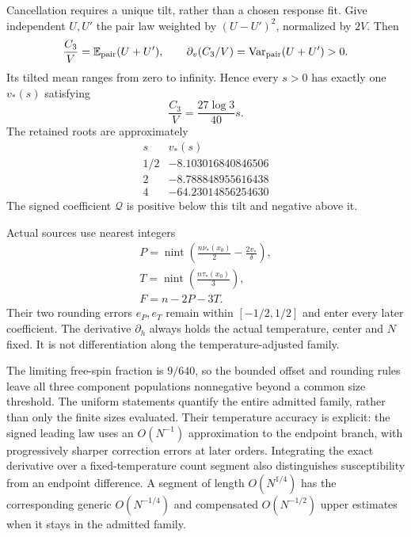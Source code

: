 Cancellation requires a unique tilt, rather than a chosen response fit. Give independent $U,U'$ the pair law weighted by $(U-U')^2$, normalized by $2V$. Then
\begin{equation}
 \frac{C_3}{V}=\mathbb E_{\rm pair}(U+U'),\qquad
 \partial_v(C_3/V)=\operatorname{Var}_{\rm pair}(U+U')>0.
\end{equation}
Its tilted mean ranges from zero to infinity. Hence every $s>0$ has exactly one $v_*(s)$ satisfying
\begin{equation}
 \frac{C_3}{V}=\frac{27\log3}{40}s.
\end{equation}
The retained roots are approximately
\[
\begin{array}{c|r}
s&v_*(s)\\\hline
1/2&-8.103016840846506\\
2&-8.788848955616438\\
4&-64.23014856254630
\end{array}
\]
The signed coefficient $\mathcal Q$ is positive below this tilt and negative above it.

Actual sources use nearest integers
\begin{equation}
\begin{gathered}
P=\operatorname{nint}\!\left(\frac{n\nu_*(x_0)}2-\frac{2v_*}{\delta}\right),
 \\
T=\operatorname{nint}\!\left(\frac{n\tau_*(x_0)}3\right),
 \\
F=n-2P-3T.
\end{gathered}
\end{equation}
Their two rounding errors $e_P,e_T$ remain within $[-1/2,1/2]$ and enter every later coefficient. The derivative $\partial_h$ always holds the actual temperature, center and $N$ fixed. It is not differentiation along the temperature-adjusted family.

The limiting free-spin fraction is $9/640$, so the bounded offset and rounding rules leave all three component populations nonnegative beyond a common size threshold. The uniform statements quantify the entire admitted family, rather than only the finite sizes evaluated. Their temperature accuracy is explicit: the signed leading law uses an $O(N^{-1})$ approximation to the endpoint branch, with progressively sharper correction errors at later orders. Integrating the exact derivative over a fixed-temperature count segment also distinguishes susceptibility from an endpoint difference. A segment of length $O(N^{1/4})$ has the corresponding generic $O(N^{-1/4})$ and compensated $O(N^{-1/2})$ upper estimates when it stays in the admitted family.

